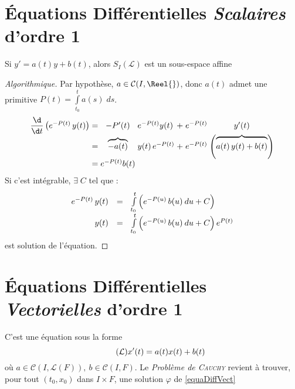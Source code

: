\documentclass[11pt,a4paper,fleqn,pdftex]{report}
\begin{document}
\section{Équations Différentielles \emph{Scalaires} d'ordre 1}
\begin{theorem}
Si $y'=a(t) y + b(t)$, alors $S_I(\mathcal{L})$ est un sous-espace affine
\end{theorem}
\begin{proof}[Algorithmique]\label{ResolEquDiffScal1}
Par hypothèse, $a \in \mathcal{C}(I,\Reel{})$, donc $a(t)$ admet une primitive $P(t)=\int \limits_{t_0}^t a(s) \; ds$.
\[\arraycolsep=1.4pt\def\arraystretch{1}
\begin{array}{r c c l l c c}
\dfrac{\d}{\d t}\left( e^{-P(t)}\, y(t) \right) &=& -P'(t) & e^{-P(t)}y(t) &+& e^{-P(t)}& y'(t)\\
&=& \overbrace{-a(t)}&y(t)\, e^{-P(t)}&+& e^{-P(t)} &\left( \overbrace{\vphantom{{3^3}^3} a(t)\, y(t) +b(t)} \right)\\
&=& e^{-P(t)}b(t)\\
\end{array}\]
Si c'est intégrable, $\exists \; C$ tel que :
\[
\begin{array}{r c l}
e^{-P(t)}\, y(t) &=& \int \limits_{t_0}^t \left( \vphantom{{3^3}^3} e^{-P(u)}\, b(u) \: du + C \right)\\
y(t) &=& \int\limits_{t_0}^t \left( \vphantom{{3^3}^3} e^{-P(u)}\, b(u) \: du + C \right) e^{P(t)}
\end{array}
\] est solution de l'équation.
\end{proof}

\section{Équations Différentielles \emph{Vectorielles} d'ordre 1}

\begin{dfn}
    C'est une équation sous la forme 
\begin{equation}\label{equaDiffVect}\tag{$\mathcal{L}$}
    x'(t) = a(t) x(t) + b(t)
\end{equation}
où $a \in \mathcal{C}\left( I,\mathcal{L}(F)\right), \: b\in \mathcal{C}(I,F)$. Le \emph{Problème de \textsc{Cauchy}}  revient à trouver, pour tout $(t_0,x_0)$ dans $I \times F$, une solution $\varphi$ de \eqref{equaDiffVect}
\end{dfn}
\end{document}
